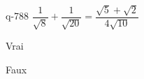 \begin{truefalse}{q-788}
$\dfrac{1}{\sqrt{8}}+\dfrac{1}{\sqrt{20}} = \dfrac{\sqrt{5}+\sqrt{2}}{4\sqrt{10}}$
\item Vrai
\item* Faux
\end{truefalse}

